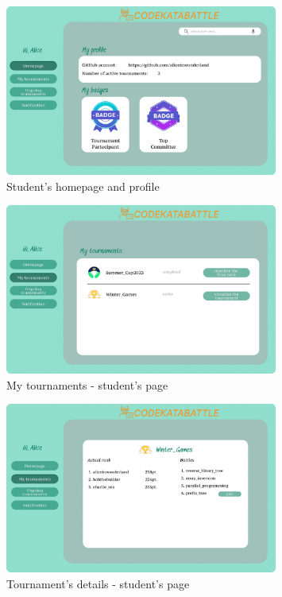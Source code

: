 \begin{figure}[H]
    \centering
    \includegraphics[width=0.8\textwidth]{images/user_interface/UI_sw2-03.png}
    \caption{Student's homepage and profile}
\end{figure}

\begin{figure}[H]
    \centering
    \includegraphics[width=0.8\textwidth]{images/user_interface/UI_sw2-04.png}
    \caption{My tournaments - student's page}
\end{figure}

\begin{figure}[H]
    \centering
    \includegraphics[width=0.8\textwidth]{images/user_interface/UI_sw2-05.png}
    \caption{Tournament's details - student's page}
\end{figure}

